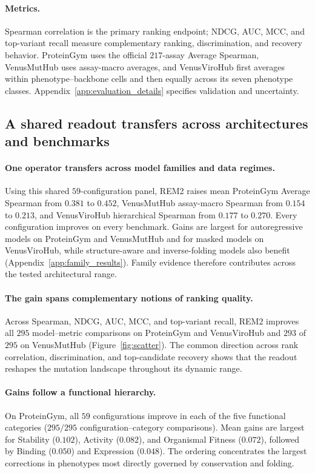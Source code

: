 \documentclass{article} %
\begin{document}
\paragraph{Metrics.}
Spearman correlation is the primary ranking endpoint; NDCG, AUC, MCC, and top-variant recall measure complementary ranking, discrimination, and recovery behavior. ProteinGym uses the official $217$-assay Average Spearman, VenusMutHub uses assay-macro averages, and VenusViroHub first averages within phenotype--backbone cells and then equally across its seven phenotype classes. Appendix~\ref{app:evaluation_details} specifies validation and uncertainty.

\subsection{A shared readout transfers across architectures and benchmarks}
\label{sec:transfer}

\paragraph{One operator transfers across model families and data regimes.}
Using this shared $59$-configuration panel, \textsc{REM2} raises mean ProteinGym Average Spearman from $0.381$ to $0.452$, VenusMutHub assay-macro Spearman from $0.154$ to $0.213$, and VenusViroHub hierarchical Spearman from $0.177$ to $0.270$. Every configuration improves on every benchmark. Gains are largest for autoregressive models on ProteinGym and VenusMutHub and for masked models on VenusViroHub, while structure-aware and inverse-folding models also benefit (Appendix~\ref{app:family_results}). Family evidence therefore contributes across the tested architectural range.

\paragraph{The gain spans complementary notions of ranking quality.}
Across Spearman, NDCG, AUC, MCC, and top-variant recall, \textsc{REM2} improves all $295$ model--metric comparisons on ProteinGym and VenusViroHub and $293$ of $295$ on VenusMutHub (Figure~\ref{fig:scatter}). The common direction across rank correlation, discrimination, and top-candidate recovery shows that the readout reshapes the mutation landscape throughout its dynamic range.

\paragraph{Gains follow a functional hierarchy.}
On ProteinGym, all $59$ configurations improve in each of the five functional categories ($295/295$ configuration--category comparisons). Mean gains are largest for Stability ($0.102$), Activity ($0.082$), and Organismal Fitness ($0.072$), followed by Binding ($0.050$) and Expression ($0.048$). The ordering concentrates the largest corrections in phenotypes most directly governed by conservation and folding.
\end{document}
